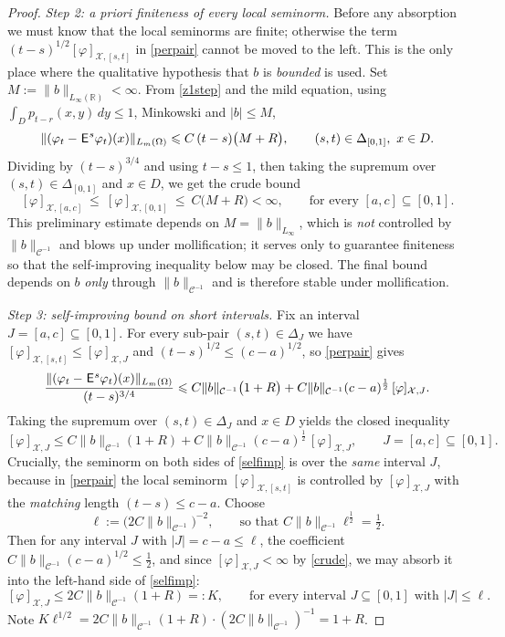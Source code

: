 \documentclass[12pt]{article}
\theoremstyle{definition}
\DeclareMathOperator{\1}{\mathbbm{1}}%
\def\E{\hskip.15ex\mathsf{E}\hskip.10ex}
\def\phi{\varphi}
\renewcommand{\le}{\leqslant}
\newcommand{\C}{\mathcal{C}}
\newcommand{\R}{\mathbb{R}}
\newcommand{\X}{\mathcal{X}}
\begin{document}
\begin{proof}
\smallskip
\emph{Step 2: a priori finiteness of every local seminorm.}
Before any absorption we must know that the local seminorms are finite; otherwise the
term $(t-s)^{1/2}[\phi]_{\X,[s,t]}$ in \eqref{perpair} cannot be moved to the left.
This is the only place where the qualitative hypothesis that $b$ is \emph{bounded} is
used. Set $M:=\|b\|_{L_\infty(\R)}<\infty$. From \eqref{z1step} and the mild equation,
using $\int_Dp_{t-r}(x,y)\,dy\le1$, Minkowski and $|b|\le M$,
\[
\|(\phi_t-\E^s\phi_t)(x)\|_{L_m(\Omega)}
\le C\,(t-s)\bigl(M+R\bigr),
\qquad (s,t)\in\Delta_{[0,1]},\ x\in D .
\]
Dividing by $(t-s)^{3/4}$ and using $t-s\le1$, then taking the supremum over
$(s,t)\in\Delta_{[0,1]}$ and $x\in D$, we get the crude bound
\begin{equation}\label{crude}
[\phi]_{\X,[a,c]}\ \le\ [\phi]_{\X,[0,1]}\ \le\ C\bigl(M+R\bigr)<\infty,
\qquad\text{for every }[a,c]\subseteq[0,1].
\end{equation}
This preliminary estimate depends on $M=\|b\|_{L_\infty}$, which is \emph{not}
controlled by $\|b\|_{\C^{-1}}$ and blows up under mollification; it serves only to
guarantee finiteness so that the self-improving inequality below may be closed. The
final bound depends on $b$ \emph{only} through $\|b\|_{\C^{-1}}$ and is therefore stable
under mollification.

\smallskip
\emph{Step 3: self-improving bound on short intervals.}
Fix an interval $J=[a,c]\subseteq[0,1]$. For every sub-pair
$(s,t)\in\Delta_{J}$ we have $[\phi]_{\X,[s,t]}\le[\phi]_{\X,J}$ and
$(t-s)^{1/2}\le(c-a)^{1/2}$, so \eqref{perpair} gives
\[
\frac{\|(\phi_t-\E^s\phi_t)(x)\|_{L_m(\Omega)}}{(t-s)^{3/4}}
\le C\|b\|_{\C^{-1}}\bigl(1+R\bigr)+C\|b\|_{\C^{-1}}(c-a)^{\frac12}\,[\phi]_{\X,J}.
\]
Taking the supremum over $(s,t)\in\Delta_J$ and $x\in D$ yields the closed inequality
\begin{equation}\label{selfimp}
[\phi]_{\X,J}\le C\|b\|_{\C^{-1}}(1+R)+C\|b\|_{\C^{-1}}(c-a)^{\frac12}\,[\phi]_{\X,J},
\qquad J=[a,c]\subseteq[0,1].
\end{equation}
Crucially, the seminorm on both sides of \eqref{selfimp} is over the \emph{same}
interval $J$, because in \eqref{perpair} the local seminorm $[\phi]_{\X,[s,t]}$ is
controlled by $[\phi]_{\X,J}$ with the \emph{matching} length $(t-s)\le c-a$. Choose
\begin{equation}\label{ellchoice}
\ell:=\bigl(2C\|b\|_{\C^{-1}}\bigr)^{-2},\qquad\text{so that }C\|b\|_{\C^{-1}}\ell^{\frac12}=\tfrac12 .
\end{equation}
Then for any interval $J$ with $|J|=c-a\le\ell$, the coefficient
$C\|b\|_{\C^{-1}}(c-a)^{1/2}\le\frac12$, and since $[\phi]_{\X,J}<\infty$ by
\eqref{crude}, we may absorb it into the left-hand side of \eqref{selfimp}:
\begin{equation}\label{shortbound}
[\phi]_{\X,J}\le 2C\|b\|_{\C^{-1}}(1+R)=:K,
\qquad\text{for every interval }J\subseteq[0,1]\text{ with }|J|\le\ell .
\end{equation}
Note $K\ell^{1/2}=2C\|b\|_{\C^{-1}}(1+R)\cdot(2C\|b\|_{\C^{-1}})^{-1}=1+R$.


\end{proof}
\end{document}
